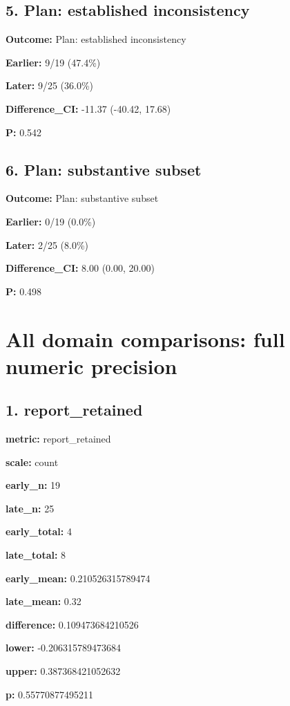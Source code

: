 \documentclass[10pt,a4paper]{article}
\begin{document}
\subsection*{5.\allowbreak{} Plan: established inconsistency}
\textbf{Outcome:} Plan: established inconsistency\par
\textbf{Earlier:} 9/\allowbreak{}19 (47.\allowbreak{}4\%)\par
\textbf{Later:} 9/\allowbreak{}25 (36.\allowbreak{}0\%)\par
\textbf{Difference\_\allowbreak{}CI:} -\allowbreak{}11.\allowbreak{}37 (-\allowbreak{}40.\allowbreak{}42, 17.\allowbreak{}68)\par
\textbf{P:} 0.\allowbreak{}542\par
\subsection*{6.\allowbreak{} Plan: substantive subset}
\textbf{Outcome:} Plan: substantive subset\par
\textbf{Earlier:} 0/\allowbreak{}19 (0.\allowbreak{}0\%)\par
\textbf{Later:} 2/\allowbreak{}25 (8.\allowbreak{}0\%)\par
\textbf{Difference\_\allowbreak{}CI:} 8.\allowbreak{}00 (0.\allowbreak{}00, 20.\allowbreak{}00)\par
\textbf{P:} 0.\allowbreak{}498\par
\clearpage\section{All domain comparisons: full numeric precision}
\subsection*{1.\allowbreak{} report\_\allowbreak{}retained}
\textbf{metric:} report\_\allowbreak{}retained\par
\textbf{scale:} count\par
\textbf{early\_\allowbreak{}n:} 19\par
\textbf{late\_\allowbreak{}n:} 25\par
\textbf{early\_\allowbreak{}total:} 4\par
\textbf{late\_\allowbreak{}total:} 8\par
\textbf{early\_\allowbreak{}mean:} 0.\allowbreak{}210526315789474\par
\textbf{late\_\allowbreak{}mean:} 0.\allowbreak{}32\par
\textbf{difference:} 0.\allowbreak{}109473684210526\par
\textbf{lower:} -\allowbreak{}0.\allowbreak{}206315789473684\par
\textbf{upper:} 0.\allowbreak{}387368421052632\par
\textbf{p:} 0.\allowbreak{}55770877495211\par
\end{document}
